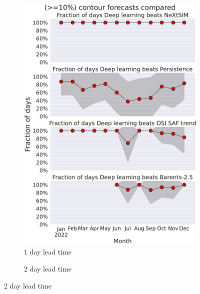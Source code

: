\documentclass[../main/thesis.tex]{subfiles}
\begin{document}
\begin{figure}
    \centering
    \begin{subfigure}{0.32\textwidth}
        \caption{1 day lead time}
        \includegraphics[width=\textwidth]{days_beat_weights_08031256.pdf}
    \end{subfigure}
    \begin{subfigure}{0.32\textwidth}
        \caption{2 day lead time}

\end{subfigure}
\end{figure}
\end{document}
